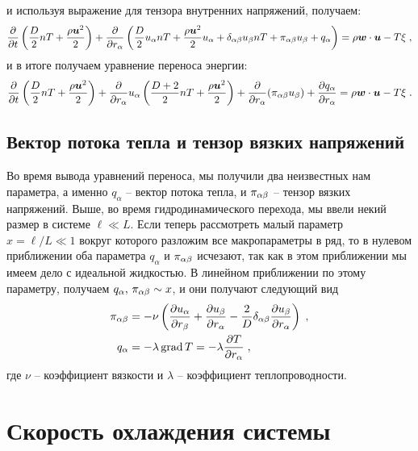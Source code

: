 и используя выражение для тензора внутренних напряжений, получаем:
\begin{equation}
  \frac{\partial}{\partial t}\left(\frac{D}{2}nT+\frac{\rho\bm{u}^2}{2}\right)+
  \frac{\partial}{\partial r_\alpha}\left(\frac{D}{2}u_\alpha nT+\frac{\rho\bm{u}^2}{2}u_\alpha+\delta_{\alpha\beta}u_\beta nT+\pi_{\alpha\beta}u_\beta+q_\alpha\right)=
  \rho\bm{w}\cdot\bm{u}-T\xi\;,
\end{equation}
и в итоге получаем уравнение переноса энергии:
\begin{equation}
  \frac{\partial}{\partial t}\left(\frac{D}{2}nT+\frac{\rho\bm{u}^2}{2}\right)+
  \frac{\partial}{\partial r_\alpha}u_\alpha\left(\frac{D+2}{2}nT+\frac{\rho\bm{u}^2}{2}\right)+\frac{\partial}{\partial r_\alpha}(\pi_{\alpha\beta}u_\beta)
  +\frac{\partial q_\alpha}{\partial r_\alpha}=\rho\bm{w}\cdot\bm{u}-T\xi\;.
\end{equation}

\subsection{Вектор потока тепла и тензор вязких напряжений}

Во время вывода уравнений переноса, мы получили два неизвестных нам параметра, а именно $q_\alpha$ -- вектор потока тепла,
и $\pi_{\alpha\beta}$ -- тензор вязких напряжений. Выше, во время гидродинамического перехода, мы ввели некий размер в системе 
$\ell\ll L$. Если теперь рассмотреть малый параметр $x=\ell/L\ll 1$ вокруг которого разложим все макропараметры в ряд, то
в нулевом приближении оба параметра $q_\alpha$ и $\pi_{\alpha\beta}$ исчезают, так как в этом приближении мы имеем дело с идеальной
жидкостью. В линейном приближении по этому параметру, получаем $q_\alpha,\,\pi_{\alpha\beta}\sim x$, и они получают следующий вид
\begin{equation}
  \begin{split}
    \pi_{\alpha\beta} &= -\nu\left(\frac{\partial u_\alpha}{\partial r_\beta}+\frac{\partial u_\beta}{\partial r_\alpha}
    -\frac{2}{D}\delta_{\alpha\beta}\frac{\partial u_\beta}{\partial r_\alpha}\right)\;,\\
    q_\alpha &= -\lambda\,\mbox{grad}\,T = -\lambda\frac{\partial T}{\partial r_\alpha}\;,
  \end{split}
\end{equation}
где $\nu$ -- коэффициент вязкости и $\lambda$ -- коэффициент теплопроводности.

\section{Скорость охлаждения системы}

